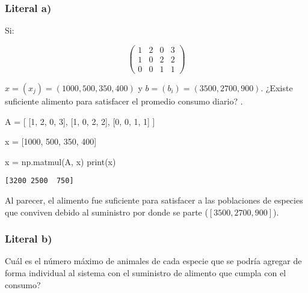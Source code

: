 \documentclass[
  letterpaper,
  DIV=11,
  numbers=noendperiod]{scrartcl}
\newenvironment{Shaded}{\begin{snugshade}}{\end{snugshade}}
\newcommand{\BuiltInTok}[1]{\textcolor[rgb]{0.00,0.23,0.31}{#1}}
\newcommand{\DecValTok}[1]{\textcolor[rgb]{0.68,0.00,0.00}{#1}}
\newcommand{\NormalTok}[1]{\textcolor[rgb]{0.00,0.23,0.31}{#1}}
\newcommand{\OperatorTok}[1]{\textcolor[rgb]{0.37,0.37,0.37}{#1}}
\begin{document}
\subsubsection{Literal a)}\label{literal-a-5}

Si:

\[\begin{pmatrix} 1 & 2 & 0 & 3 \\ 1 & 0 & 2 & 2 \\ 0 & 0 & 1 & 1 \end{pmatrix}\]

\(x = (x_j) = (1000, 500, 350, 400)\) y
\(b = (b_i) = (3500, 2700, 900)\). ¿Existe suficiente alimento para
satisfacer el promedio consumo diario? .

\begin{Shaded}
\begin{Highlighting}[]

\NormalTok{A }\OperatorTok{=}\NormalTok{ [}
\NormalTok{    [}\DecValTok{1}\NormalTok{, }\DecValTok{2}\NormalTok{, }\DecValTok{0}\NormalTok{, }\DecValTok{3}\NormalTok{],}
\NormalTok{    [}\DecValTok{1}\NormalTok{, }\DecValTok{0}\NormalTok{, }\DecValTok{2}\NormalTok{, }\DecValTok{2}\NormalTok{],}
\NormalTok{    [}\DecValTok{0}\NormalTok{, }\DecValTok{0}\NormalTok{, }\DecValTok{1}\NormalTok{, }\DecValTok{1}\NormalTok{]}
\NormalTok{]}

\NormalTok{x }\OperatorTok{=}\NormalTok{ [}\DecValTok{1000}\NormalTok{, }\DecValTok{500}\NormalTok{, }\DecValTok{350}\NormalTok{, }\DecValTok{400}\NormalTok{]}

\NormalTok{x }\OperatorTok{=}\NormalTok{ np.matmul(A, x)}
\BuiltInTok{print}\NormalTok{(x)}
\end{Highlighting}
\end{Shaded}

\begin{verbatim}
[3200 2500  750]
\end{verbatim}

Al parecer, el alimento fue suficiente para satisfacer a las poblaciones
de especies que conviven debido al suministro por donde se parte
(\([3500, 2700, 900]\)).

\subsubsection{Literal b)}\label{literal-b-5}

Cuál es el número máximo de animales de cada especie que se podría
agregar de forma individual al sistema con el suministro de alimento que
cumpla con el consumo?
\end{document}
